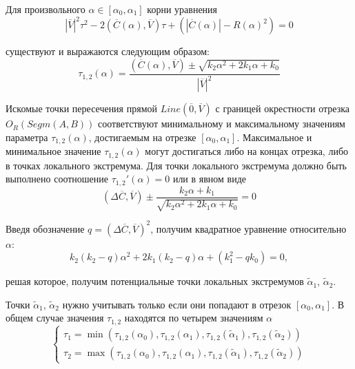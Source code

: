 Для произвольного $\alpha \in [\alpha_0, \alpha_1]$ корни уравнения
\begin{equation}
	|\overline{V}|^2 \tau^2 - 2(\overline{C}(\alpha), \overline{V}) \tau + \left( |\overline{C}(\alpha)| - R(\alpha)^2 \right) = 0
\end{equation}

существуют и выражаются следующим образом:
\begin{equation}
	\tau_{1,2}(\alpha) = \frac{(\overline{C}(\alpha), \overline{V}) \pm \sqrt{k_2 \alpha^2 + 2 k_1 \alpha + k_0}}{|\overline{V}|^2}
\end{equation}

Искомые точки пересечения прямой $Line(\overline{0}, \overline{V})$ с границей окрестности отрезка $O_R(Segm(A, B))$ соответствуют минимальному и максимальному значениям параметра $\tau_{1,2}(\alpha)$, достигаемым на отрезке $[\alpha_0, \alpha_1]$.
Максимальное и минимальное значение $\tau_{1,2}(\alpha)$ могут достигаться либо на концах отрезка, либо в точках локального экстремума.
Для точки локального экстремума должно быть выполнено соотношение $\tau_{1,2}'(\alpha) = 0$ или в явном виде
\begin{equation}
	(\Delta \overline{C}, \overline{V}) \pm \frac{k_2 \alpha + k_1}{ \sqrt{k_2 \alpha^2 + 2 k_1 \alpha + k_0} } = 0
\end{equation}

Введя обозначение $q = (\Delta \overline{C}, \overline{V})^2$, получим квадратное уравнение относительно $\alpha$:
\begin{equation}
	k_2 (k_2 - q) \alpha^2 + 2 k_1 (k_2 - q) \alpha + (k_1^2 - q k_0) = 0,
\end{equation}

решая которое, получим потенциальные точки локальных экстремумов $\tilde{\alpha}_1$, $\tilde{\alpha}_2$.

Точки $\tilde{\alpha}_1$, $\tilde{\alpha}_2$ нужно учитывать только если они попадают в отрезок $[\alpha_0, \alpha_1]$.
В общем случае значения $\tau_{1,2}$ находятся по четырем значениям $\alpha$
\begin{equation}
	\left\{
		\begin{aligned}
			\tau_1 = \min(\tau_{1,2}(\alpha_0), \tau_{1,2}(\alpha_1), \tau_{1,2}(\tilde{\alpha}_1), \tau_{1,2}(\tilde{\alpha}_2)) \\
			\tau_2 = \max(\tau_{1,2}(\alpha_0), \tau_{1,2}(\alpha_1), \tau_{1,2}(\tilde{\alpha}_1), \tau_{1,2}(\tilde{\alpha}_2))
		\end{aligned}
	\right.
\end{equation}

